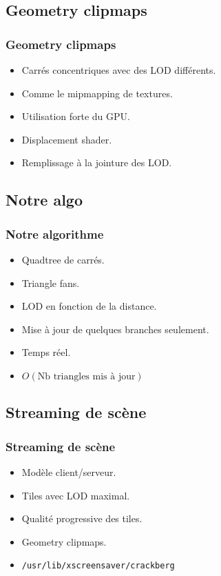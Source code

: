 \documentclass[hyperref={pdfpagelabels=false}]{beamer}
\begin{document}
\subsection{Geometry clipmaps}
\begin{frame}
  \frametitle{Geometry clipmaps}
  \begin{itemize}
  \item Carrés concentriques avec des LOD différents.
  \item Comme le mipmapping de textures.
  \item Utilisation forte du GPU.
  \item Displacement shader.
  \item Remplissage à la jointure des LOD.
  \end{itemize}
\end{frame}

\subsection{Notre algo}
\begin{frame}
  \frametitle{Notre algorithme}
  \begin{itemize}
  \item Quadtree de carrés.
  \item Triangle fans.
  \item LOD en fonction de la distance.
  \item Mise à jour de quelques branches seulement.
  \item Temps réel.
  \item $O(\text{Nb triangles mis à jour})$
  \end{itemize}
\end{frame}

\subsection{Streaming de scène}
\begin{frame}
  \frametitle{Streaming de scène}
  \begin{itemize}
  \item Modèle client/serveur.
  \item Tiles avec LOD maximal.
  \item Qualité progressive des tiles.
  \item Geometry clipmaps.
  \item \texttt{/usr/lib/xscreensaver/crackberg}
  \end{itemize}
\end{frame}
\end{document}
